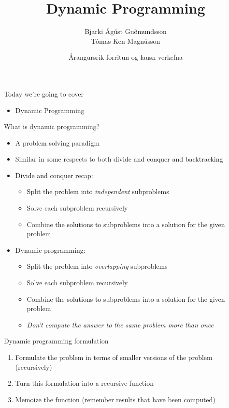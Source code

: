 \documentclass[12pt,t]{beamer}
\title{Dynamic Programming}
\author{Bjarki Ágúst Guðmundsson \\ Tómas Ken Magnússon}
\institute{\href{http://ru.is/td}{School of Computer Science} \\[2pt] \href{http://ru.is}{Reykjavík University}}
\date{Árangursrík forritun og lausn verkefna}
\newcommand{\bi}{\begin{itemize}}
\newcommand{\ei}{\end{itemize}}
\newcommand{\be}{\begin{enumerate}}
\newcommand{\ee}{\end{enumerate}}
\begin{document}
{
    \frame{
        \titlepage
    }
}


\begin{frame}{Today we're going to cover}
    \vspace{40pt}
    \bi
        \item Dynamic Programming
    \ei
\end{frame}

\begin{frame}{What is dynamic programming?}
    \bi
        \item A problem solving paradigm
        \item Similar in some respects to both divide and conquer and backtracking
        \vspace{5pt}
        \item Divide and conquer recap:
            \bi
                \item Split the problem into \textit{independent} subproblems
                \item Solve each subproblem recursively
                \item Combine the solutions to subproblems into a solution for the given problem
            \ei
        \vspace{5pt}
        \item Dynamic programming:
            \bi
                \item Split the problem into \textit{overlapping} subproblems
                \item Solve each subproblem recursively
                \item Combine the solutions to subproblems into a solution for the given problem
                \item \textit{Don't compute the answer to the same problem more than once}
            \ei
    \ei
\end{frame}

\begin{frame}[fragile]{Dynamic programming formulation}
    \vspace{30pt}
    \be
        \item Formulate the problem in terms of smaller versions of the problem (recursively)
        \item Turn this formulation into a recursive function
        \item Memoize the function (remember results that have been computed)
    \ee
\end{frame}
\end{document}
